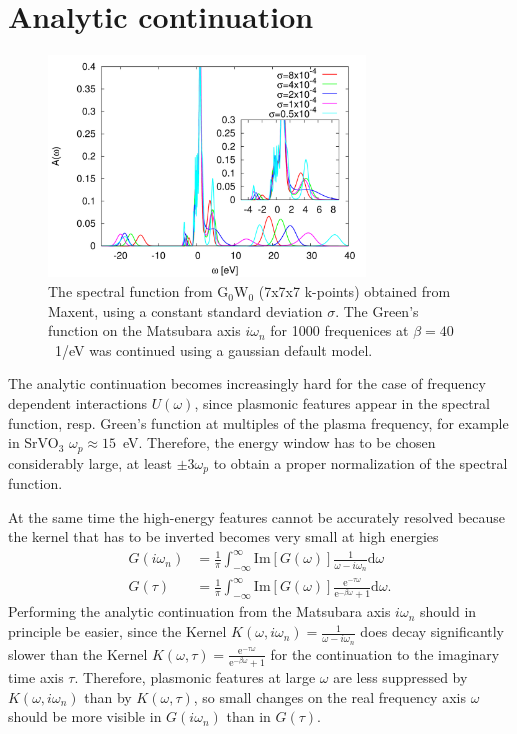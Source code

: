 \documentclass[12pt,a4paper]{scrartcl}
\numberwithin{equation}{section}
\begin{document}
\section{Analytic continuation}
\begin{figure}[t]
\begin{center}
\includegraphics[width=0.75\textwidth]{figs/GW_maxent_diffSigma.pdf} 
\end{center}
\caption{The spectral function from G$_0$W$_0$ (7x7x7 k-points) obtained from
Maxent, using a constant standard deviation $\sigma$. The Green's function
on the Matsubara axis $i\omega_n$ for 1000 frequenices at $\beta=40$\ 1/eV was continued
using a gaussian default model.}
\label{fig:gw_anacont_diff_sigma}
\end{figure}

The analytic continuation becomes increasingly hard for the case
of frequency dependent interactions $U(\omega)$,
since plasmonic features appear in the spectral function, resp.
Green's function at multiples of the plasma frequency,
for example in SrVO$_3$ $\omega_p\approx 15$~eV.
Therefore, the energy window has to be chosen considerably large, at least $\pm 3\omega_p$
to obtain a proper normalization of the spectral function.

At the same time the high-energy features cannot be accurately resolved because the
kernel that has to be inverted becomes very small at high energies
\begin{align}
G(i\omega_n) &= \frac{1}{\pi} \int_{-\infty}^{\infty} \mathrm{Im}[G(\omega)] 
                                \frac{1}{\omega-i\omega_n}\mathrm{d}\omega \\
G(\tau) &= \frac{1}{\pi} \int_{-\infty}^{\infty} \mathrm{Im}[G(\omega)]
                             \frac{\mathrm{e}^{-\tau\omega}}{\mathrm{e}^{-\beta\omega}+1}\mathrm{d}\omega.
\end{align}
Performing the analytic continuation from the Matsubara axis $i\omega_n$
should in principle be easier, since the Kernel $K(\omega,i\omega_n)= \frac{1}{\omega-i\omega_n}$
does decay significantly slower than the Kernel
$K(\omega,\tau)=\frac{\mathrm{e}^{-\tau\omega}}{\mathrm{e}^{-\beta\omega}+1}$
for the continuation to the imaginary time axis $\tau$.
Therefore, plasmonic features at large $\omega$ are less suppressed
by $K(\omega,i\omega_n)$ than by $K(\omega,\tau)$, so small changes on the real
frequency axis $\omega$ should be more visible in $G(i\omega_n)$ than in $G(\tau)$.
\end{document}
